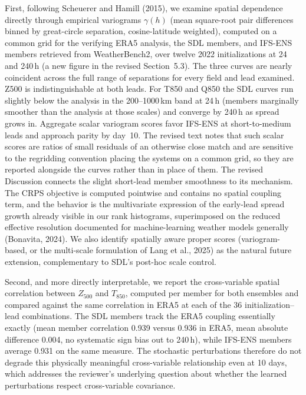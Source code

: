 \documentclass[12pt]{article}
\begin{document}
First, following Scheuerer and Hamill (2015), we examine spatial dependence directly
through empirical variograms $\gamma(h)$ (mean square-root pair differences binned
by great-circle separation, cosine-latitude weighted), computed on a common grid for
the verifying ERA5 analysis, the SDL members, and IFS-ENS members retrieved from
WeatherBench2, over twelve 2022 initializations at 24 and 240\,h (a new figure in the revised
Section~5.3). The
three curves are nearly coincident across the full range of separations for every
field and lead examined. Z500 is indistinguishable at both leads. For T850 and Q850
the SDL curves run slightly below the analysis in the 200--1000\,km band at 24\,h
(members marginally smoother than the analysis at those scales) and converge by
240\,h as spread grows in. Aggregate scalar variogram scores favor IFS-ENS at
short-to-medium leads and approach parity by day~10. The revised text notes that
such scalar scores are ratios of small residuals of an otherwise close match and are
sensitive to the regridding convention placing the systems on a common grid, so they
are reported alongside the curves rather than in place of them. The revised
Discussion connects the slight short-lead member smoothness to its mechanism. The
CRPS objective is computed pointwise and contains no spatial coupling term, and the
behavior is the multivariate expression of the early-lead spread growth already
visible in our rank histograms, superimposed on the reduced effective resolution
documented for machine-learning weather models generally (Bonavita, 2024). We also
identify spatially aware proper scores (variogram-based, or the multi-scale
formulation of Lang et al., 2025) as the natural future extension, complementary to
SDL's post-hoc scale control.

Second, and more directly interpretable, we report the cross-variable spatial correlation
between $Z_{500}$ and $T_{850}$, computed per member for both ensembles and compared
against the same correlation in ERA5 at each of the 36 initialization--lead
combinations. The SDL members track the ERA5 coupling essentially exactly (mean
member correlation 0.939 versus 0.936 in ERA5, mean absolute difference 0.004, no
systematic sign bias out to 240\,h), while IFS-ENS members average 0.931 on the
same measure. The stochastic perturbations therefore do not degrade this physically
meaningful cross-variable relationship even at 10 days, which addresses the
reviewer's underlying question about whether the learned perturbations respect
cross-variable covariance.
\end{document}
